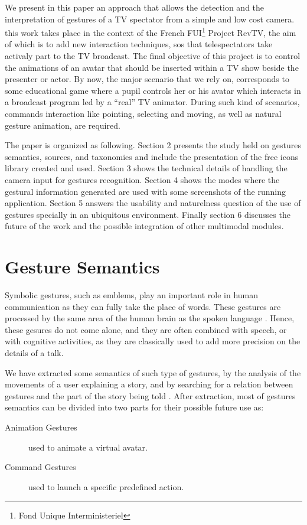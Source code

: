 \documentclass{llncs}
\begin{document}
We present in this paper an approach that allows the detection and the
interpretation of gestures of a TV spectator from a simple and low cost camera. this work takes place in the context of the French FUI\footnote{Fond Unique Interministeriel} Project RevTV,  the aim of which is to add new interaction techniques, sos that telespectators take activaly part to the TV broadcast.
The final objective of this project is to control the animations of an avatar
that should be inserted within a TV show beside the presenter or actor.
By now, the major scenario that we rely on, corresponds to some educational game where a pupil
controls her or his avatar which interacts in a broadcast program led by a ``real'' TV animator.
During such kind of scenarios, commands interaction like pointing, selecting and moving, as well as natural gesture animation, are required.

The paper is organized as following.
Section 2 presents the study held on gestures
semantics, sources, and taxonomies and include the presentation of the free
icons library created and used.
Section 3 shows the technical details of handling the camera input for gestures recognition.
Section 4 shows the modes where the gestural information generated are used
with some screenshots of the running application.
Section 5 answers the usability and naturelness question of the use of gestures
specially in an ubiquitous environment.
Finally section 6 discusses the future of the work and the possible integration of
other multimodal modules.

\section{Gesture Semantics}
Symbolic gestures, such as emblems, play an important role in human
communication as they can fully take the place of words. These gestures are processed by the same area of the human brain as the spoken language \cite{SymbolicGest}. Hence, these gesures do not come alone, and they are often combined with speech, or with cognitive
activities, as they are classically used to add more precision on the details of a talk.


We have extracted some semantics of such type of gestures, by the analysis of the movements of
a user explaining a story, and by searching for a relation between gestures and the
part of the story being told \cite{gestureThought}. After extraction, most of gestures semantics can be divided into two parts for
their possible future use as:
\begin{description}
 \item[Animation Gestures] used to animate a virtual avatar.
 \item[Command Gestures] used to launch a specific predefined action.
\end{description}
\end{document}
